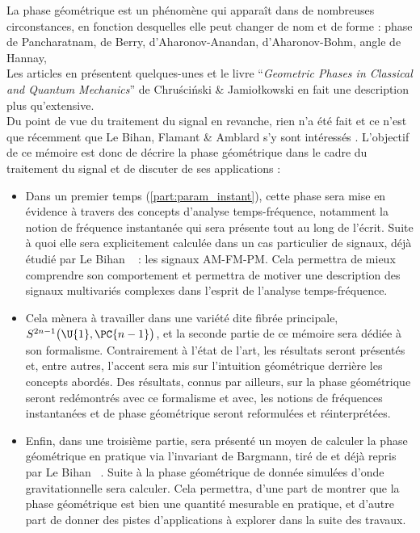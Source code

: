 La phase géométrique est un phénomène qui apparaît dans de nombreuses circonstances, en fonction desquelles elle peut changer de nom et de forme : phase de Pancharatnam, de Berry, d'Aharonov-Anandan, d'Aharonov-Bohm, angle de Hannay, \etc
\\
Les articles \cite{cohen_geometric_2019,sjoqvist_geometric_2015} en présentent quelques-unes et le livre ``\textit{Geometric Phases in Classical and Quantum Mechanics}'' \cite{chruscinski_geometric_2004} de Chru\'sci\'nski \& Jamio\l kowski en fait une description plus qu'extensive.
\\

Du point de vue du traitement du signal en revanche, rien n'a été fait et ce n'est que récemment que Le Bihan, Flamant \& Amblard s'y sont intéressés \cite{le_bihan_modephysiques_2023, le_bihan_geometric_2024}.
L'objectif de ce mémoire est donc de décrire la phase géométrique dans le cadre du traitement du signal et de discuter de ses applications :
\\
\begin{itemize}
	\item Dans un premier temps (\cref{part:param_instant}), cette phase sera mise en évidence à travers des concepts d'analyse temps-fréquence, notamment la notion de fréquence instantanée qui sera présente tout au long de l'écrit. 
	Suite à quoi elle sera explicitement calculée dans un cas particulier de signaux, déjà étudié par Le Bihan \etal~\cite{le_bihan_geometric_2024} : les signaux AM-FM-PM.
	Cela permettra de mieux comprendre son comportement et permettra de motiver une description des signaux multivariés complexes dans l'esprit de l'analyse temps-fréquence.
	
	\item Cela mènera à travailler dans une variété dite fibrée principale, $S^{2n-1} \big(\U{1}, \PC{n-1}\big)$, et la seconde partie de ce mémoire sera dédiée à son formalisme. Contrairement à l'état de l'art, les résultats seront présentés et, entre autres, l'accent sera mis sur l'intuition géométrique derrière les concepts abordés.
	Des résultats, connus par ailleurs, sur la phase géométrique seront redémontrés avec ce formalisme et avec, les notions de fréquences instantanées et de phase géométrique seront reformulées et réinterprétées. 
	
	\item Enfin, dans une troisième partie, sera présenté un moyen de calculer la phase géométrique en pratique via l'invariant de Bargmann, tiré de \cite{rabei_bargmann_1999} et déjà repris par Le Bihan \etal~\cite{le_bihan_geometric_2024}. Suite à la phase géométrique de donnée simulées d'onde gravitationnelle sera calculer. Cela permettra, d'une part de montrer que la phase géométrique est bien une quantité mesurable en pratique, et d'autre part de donner des pistes d'applications à explorer dans la suite des travaux.
\end{itemize}





